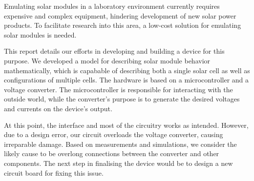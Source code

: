

Emulating  solar  modules  in  a  laboratory  environment  currently  requires
expensive  and complex  equipment, hindering  development of  new solar  power
products. To  facilitate research  into  this area,  a  low-cost solution  for
emulating solar modules is needed.

This  report details  our  efforts in  developing and  building  a device  for
this  purpose. We  developed a  model  for  describing solar  module  behavior
mathematically, which is  capabable of describing both a single  solar cell as
well  as  configurations  of  multiple  cells. The  hardware  is  based  on  a
microcontroller and  a voltage  converter. The microcontroller  is responsible
for interacting  with the outside world,  while the converter's purpose  is to
generate the desired voltages and currents on the device's output.

At this  point, the  interface and  most of the  circuitry works  as intended.
However, due to  a design error, our circuit overloads  the voltage converter,
causing  irreparable  damage.   Based  on  measurements  and  simulations,  we
consider the likely cause to be overlong connections between the converter and
other components.  The next step in finalising the device would be to design a
new circuit board for fixing this issue.
